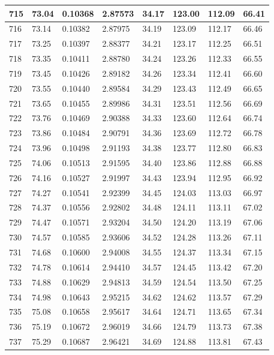 \documentclass[12pt,a4paper,twoside]{article}
\begin{document}
\begin{center}
\begin{longtable}{l l l l | l l l l}
715 & 73.04 & 0.10368 & 2.87573 & 34.17 & 123.00 & 112.09 & 66.41 \\ \hline
716 & 73.14 & 0.10382 & 2.87975 & 34.19 & 123.09 & 112.17 & 66.46 \\ \hline
717 & 73.25 & 0.10397 & 2.88377 & 34.21 & 123.17 & 112.25 & 66.51 \\ \hline
718 & 73.35 & 0.10411 & 2.88780 & 34.24 & 123.26 & 112.33 & 66.55 \\ \hline
719 & 73.45 & 0.10426 & 2.89182 & 34.26 & 123.34 & 112.41 & 66.60 \\ \hline
720 & 73.55 & 0.10440 & 2.89584 & 34.29 & 123.43 & 112.49 & 66.65 \\ \hline
721 & 73.65 & 0.10455 & 2.89986 & 34.31 & 123.51 & 112.56 & 66.69 \\ \hline
722 & 73.76 & 0.10469 & 2.90388 & 34.33 & 123.60 & 112.64 & 66.74 \\ \hline
723 & 73.86 & 0.10484 & 2.90791 & 34.36 & 123.69 & 112.72 & 66.78 \\ \hline
724 & 73.96 & 0.10498 & 2.91193 & 34.38 & 123.77 & 112.80 & 66.83 \\ \hline
725 & 74.06 & 0.10513 & 2.91595 & 34.40 & 123.86 & 112.88 & 66.88 \\ \hline
726 & 74.16 & 0.10527 & 2.91997 & 34.43 & 123.94 & 112.95 & 66.92 \\ \hline
727 & 74.27 & 0.10541 & 2.92399 & 34.45 & 124.03 & 113.03 & 66.97 \\ \hline
728 & 74.37 & 0.10556 & 2.92802 & 34.48 & 124.11 & 113.11 & 67.02 \\ \hline
729 & 74.47 & 0.10571 & 2.93204 & 34.50 & 124.20 & 113.19 & 67.06 \\ \hline
730 & 74.57 & 0.10585 & 2.93606 & 34.52 & 124.28 & 113.26 & 67.11 \\ \hline
731 & 74.68 & 0.10600 & 2.94008 & 34.55 & 124.37 & 113.34 & 67.15 \\ \hline
732 & 74.78 & 0.10614 & 2.94410 & 34.57 & 124.45 & 113.42 & 67.20 \\ \hline
733 & 74.88 & 0.10629 & 2.94813 & 34.59 & 124.54 & 113.50 & 67.25 \\ \hline
734 & 74.98 & 0.10643 & 2.95215 & 34.62 & 124.62 & 113.57 & 67.29 \\ \hline
735 & 75.08 & 0.10658 & 2.95617 & 34.64 & 124.71 & 113.65 & 67.34 \\ \hline
736 & 75.19 & 0.10672 & 2.96019 & 34.66 & 124.79 & 113.73 & 67.38 \\ \hline
737 & 75.29 & 0.10687 & 2.96421 & 34.69 & 124.88 & 113.81 & 67.43 \\ \hline

\end{longtable}
\end{center}
\end{document}
